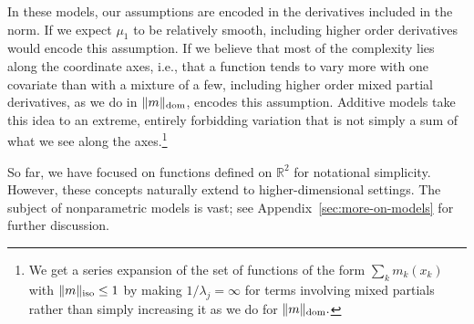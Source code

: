 \documentclass{article}
\DeclarePairedDelimiter\norm{\lVert}{\rVert}
\DeclarePairedDelimiter\abs{\lvert}{\rvert}
\DeclarePairedDelimiter\set{\{}{\}}
\theoremstyle{definition}
\newcommand{\R}{\ensuremath{\mathbb{R}}}
\newcommand{\calM}{\ensuremath{\mathcal{M}}}
\DeclareMathOperator{\imbalance}{imbalance}
\newcommand{\model}{\mathcal{M}}
\newcommand{\<}{\langle}
\renewcommand{\>}{\rangle}
\newcommand\cmnt[2]{\;
{\textcolor{red}{[{\em #1 --- #2}] \;}
}}
\newcommand\eli[1]{\cmnt{#1}{Eli}}
\newcommand\dah[1]{\cmnt{#1}{Skip}}
\begin{document}
In these models, our assumptions are encoded in the derivatives included in the norm.
If we expect $\mu_1$ to be relatively smooth, including higher order derivatives would encode this assumption.
If we believe that most of the complexity lies along the coordinate axes, i.e., that a function tends to vary more with one covariate than with a mixture of a few, including higher order mixed partial derivatives, as we do in $\norm{m}_{\text{dom}}$, encodes this assumption.
Additive models take this idea to an extreme, entirely
forbidding variation that is not simply a sum of what we see along the axes.\footnote{We get a series expansion of the set of functions of the form $\sum_k m_k(x_k)$ with $\norm{m}_{\text{iso}} \le 1$ by making $1/\lambda_j=\infty$ for terms involving mixed partials rather than simply increasing it as we do for $\norm{m}_{\text{dom}}.$}





So far, we have focused on functions defined on $\mathbb{R}^2$ for notational simplicity. However, these concepts naturally extend to higher-dimensional settings.
The subject of nonparametric models is vast; see Appendix~\ref{sec:more-on-models} for further discussion.
\end{document}
